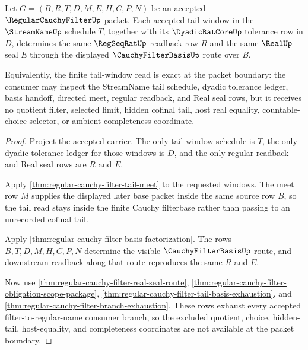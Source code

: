 \begin{theorem}
\label{thm:regular-cauchy-filter-tail-window-exactness}
Let $G=(B,R,T,D,M,E,H,C,P,N)$ be an accepted $\RegularCauchyFilterUp$ packet. Each accepted tail window in the $\StreamNameUp$ schedule $T$, together with its $\DyadicRatCoreUp$ tolerance row in $D$, determines the same $\RegSeqRatUp$ readback row $R$ and the same $\RealUp$ seal $E$ through the displayed $\CauchyFilterBasisUp$ route over $B$.

Equivalently, the finite tail-window read is exact at the packet boundary: the consumer may inspect the StreamName tail schedule, dyadic tolerance ledger, basis handoff, directed meet, regular readback, and Real seal rows, but it receives no quotient filter, selected limit, hidden cofinal tail, host real equality, countable-choice selector, or ambient completeness coordinate.
\end{theorem}
\begin{proof}
Project the accepted carrier. The only tail-window schedule is $T$, the only dyadic tolerance ledger for those windows is $D$, and the only regular readback and Real seal rows are $R$ and $E$.

Apply \autoref{thm:regular-cauchy-filter-tail-meet} to the requested windows. The meet row $M$ supplies the displayed later base packet inside the same source row $B$, so the tail read stays inside the finite Cauchy filterbase rather than passing to an unrecorded cofinal tail.

Apply \autoref{thm:regular-cauchy-filter-basis-factorization}. The rows $B,T,D,M,H,C,P,N$ determine the visible $\CauchyFilterBasisUp$ route, and downstream readback along that route reproduces the same $R$ and $E$.

Now use \autoref{thm:regular-cauchy-filter-real-seal-route}, \autoref{thm:regular-cauchy-filter-obligation-scope-package}, \autoref{thm:regular-cauchy-filter-tail-basis-exhaustion}, and \autoref{thm:regular-cauchy-filter-branch-exhaustion}. These rows exhaust every accepted filter-to-regular-name consumer branch, so the excluded quotient, choice, hidden-tail, host-equality, and completeness coordinates are not available at the packet boundary.
\end{proof}

